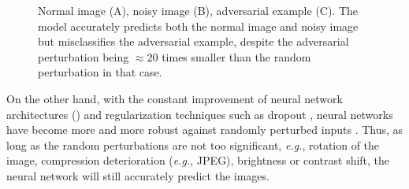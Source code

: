 \begin{figure}[!htb]
      

    \caption{ Normal image (A), noisy image (B), adversarial example (C). The
        model accurately predicts both the normal image and noisy image but
        misclassifies the adversarial example, despite the adversarial
        perturbation being $\approx{20}$ times smaller than the random
        perturbation in that case. }
    \label{fig:noise}
\end{figure}

On the other hand, with the constant improvement of neural network architectures
(\cite{he_deep_2015,vaswani_attention_2017,huang_densely_2018}) and
regularization techniques such as dropout \cite{srivastava_dropout_2014}, neural
networks have become more and more robust against randomly perturbed inputs
\cite{hendrycks_benchmarking_2019}. Thus, as long as the random perturbations
are not too significant, \emph{e.g.}, rotation of the image, compression
deterioration (\emph{e.g.}, JPEG), brightness or contrast shift, the neural
network will still accurately predict the images.

